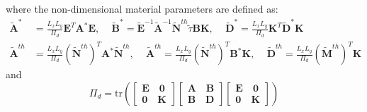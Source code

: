 \documentclass[journal]{new-aiaa}
\begin{document}
where the non-dimensional material parameters are defined as:
\begin{equation}
\begin{aligned}
\tilde{\bm{A}}^\ast &= \frac{L_x L_y}{\Pi_d}\bm{E}^T\bm{A}^\ast\bm{E} ,\,  \quad 
\tilde{\bm{B}}^\ast  									=\tilde{\bm{E}}^{-1}\tilde{\bm{A}}^{-1}\tilde{\bm{N}}^{th}\tilde{\tau}\bm{B}\bm{K}
,\,\quad   
\tilde{\bm{D}}^\ast = \frac{L_x L_y}{\Pi_d}\bm{K}^T\tilde{\bm{D}}^\ast\bm{K}  \\  
\tilde{\bm{A}}^{th} &= \frac{L_x L_y}{\Pi_d}\left(\tilde{\bm{N}}^{th}\right)^T\bm{A}^\ast   \tilde{\bm{N}}^{th} ,\,    \quad 
\tilde{\bm{A}}^{th} = \frac{L_x L_y}{\Pi_d}\left(\tilde{\bm{N}}^{th}\right)^T\bm{B}^\ast   {\bm{K}} ,\,    \quad 
\tilde{\bm{D}}^{th} = \frac{L_x L_y}{\Pi_d}\left(\tilde{\bm{M}}^{th}\right)^T\bm{K}  
% 
% 
%
%
\end{aligned}
\end{equation}
and 
\begin{equation}
\Pi_d=\mathrm{tr}\left(\begin{bmatrix}
\mathbf{E} \quad \mathbf{0} \\\mathbf{0} \quad \mathbf{K}
\end{bmatrix}
\begin{bmatrix}
\mathbf{A} \quad \mathbf{B} \\\mathbf{B} \quad \mathbf{D}
\end{bmatrix}
\begin{bmatrix}
\mathbf{E} \quad \mathbf{0} \\\mathbf{0} \quad \mathbf{K}
\end{bmatrix}
\right)  
\end{equation}
\end{document}

